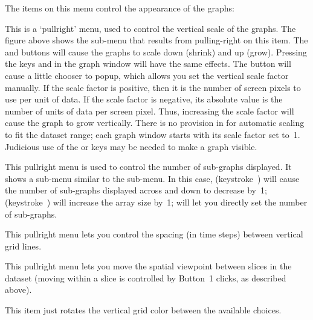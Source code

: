 The items on this menu control the appearance of the graphs:
\begin{description}

    This is a `pullright' menu, used to control the
                 vertical scale of the graphs.  The figure above
                 shows the sub-menu that results from pulling-right
                 on this item.  The  and 
                 buttons will cause the graphs to scale down (shrink)
                 and up (grow).  Pressing the keys \kq{-} and \kq{+}
                 in the graph window will have the same effects.
                 The  button will cause a little
                 chooser to popup, which allows you set the vertical
                 scale factor manually.  If the scale factor
                 is positive, then it is the number of screen pixels
                 to use per unit of data.  If the scale factor is
                 negative, its absolute value is the number of units
                 of data per screen pixel.  Thus, increasing the
                 scale factor will cause the graph to grow vertically.
                 There is no provision in \afnit for automatic
                 scaling to fit the dataset range; each graph window
                 starts with its scale factor set to~1.  Judicious
                 use of the \kq{-} or \kq{+} keys may be needed to
                 make a graph visible.

    This pullright menu is used to control the number
                  of sub-graphs displayed.  It shows a sub-menu
                  similar to the  sub-menu.
                  In this case,  (keystroke~)
                  will cause the number of sub-graphs displayed
                  across and down to decrease by~1; 
                  (keystroke~) will increase the array size by~1;
                   will let you directly set the
                  number of sub-graphs.

    This pullright menu lets you control the spacing
                (in time steps) between vertical grid lines.

   This pullright menu lets you move the spatial viewpoint
                between slices in the dataset (moving within a slice is controlled
                by Button~1 clicks, as described above).

   This item just rotates the vertical grid color between the
                     available choices.


\end{description}
